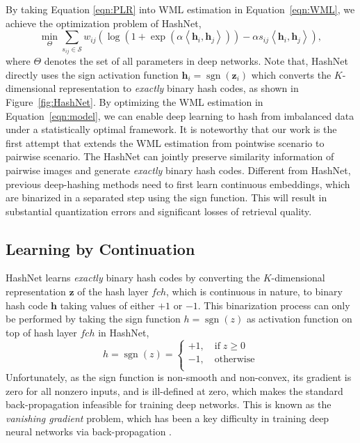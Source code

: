 \documentclass[10pt,twocolumn,letterpaper]{article}
\begin{document}
By taking Equation \eqref{eqn:PLR} into WML estimation in Equation~\eqref{eqn:WML}, we achieve the optimization problem of HashNet,
\begin{equation}\label{eqn:model}
	\mathop {\min }\limits_{\Theta}  \sum\limits_{{s_{ij}} \in \mathcal{S}} {{w_{ij}}\left( {\log \left( {1 + \exp \left( {\alpha \left\langle {{{\bm{h}}_i},{{\bm{h}}_j}} \right\rangle } \right)} \right) - \alpha {s_{ij}}\left\langle {{{\bm{h}}_i},{{\bm{h}}_j}} \right\rangle } \right)},
\end{equation}
where ${\Theta}$ denotes the set of all parameters in deep networks. Note that, HashNet directly uses the sign activation function ${{\bm{h}}_i} = \operatorname{sgn} \left( {{{\bm{z}}_i}} \right)$ which converts the $K$-dimensional representation to \emph{exactly} binary hash codes, as shown in Figure~\ref{fig:HashNet}. By optimizing the WML estimation in Equation~\eqref{eqn:model}, we can enable deep learning to hash from imbalanced data under a statistically optimal framework. It is noteworthy that our work is the first attempt that extends the WML estimation from pointwise scenario to pairwise scenario. The HashNet can jointly preserve similarity information of pairwise images and generate \emph{exactly} binary hash codes. Different from HashNet, previous deep-hashing methods need to first learn continuous embeddings, which are binarized in a separated step using the sign function. This will result in substantial quantization errors and significant losses of retrieval quality.

\subsection{Learning by Continuation}
HashNet learns \emph{exactly} binary hash codes by converting the $K$-dimensional representation ${\bm z}$ of the hash layer $fch$, which is continuous in nature, to binary hash code ${\bm h}$ taking values of either $+1$ or $-1$. This binarization process can only be performed by taking the sign function $h = \operatorname{sgn} \left( z \right)$ as activation function on top of hash layer $fch$ in HashNet,
\begin{equation}\label{eqn:sgn}
  h = \operatorname{sgn} \left( z \right) =
  \begin{cases}
   + 1,\quad {\text{if}}\;z \geqslant 0 \\
   - 1,\quad {\text{otherwise}} \\ 
  \end{cases}
\end{equation}
Unfortunately, as the sign function is non-smooth and non-convex, its gradient is zero for all nonzero inputs, and is ill-defined at zero, which makes the standard back-propagation infeasible for training deep networks. This is known as the \emph{vanishing gradient} problem, which has been a key difficulty in training deep neural networks via back-propagation \cite{cite:NC06DBN}. 
\end{document}
